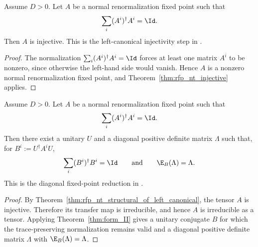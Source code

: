 \begin{theorem}%
    \label{thm:rfp_nt_structural_of_left_canonical}
    \leanok
    Assume $D > 0$. Let $A$ be a normal renormalization fixed point such that
    \[
        \sum_i (A^i)^\dagger A^i = \Id.
    \]
    Then $A$ is injective.
    This is the left-canonical injectivity step in
    \cite[Appendix~B]{Cirac2016MPDO_arXiv}.
\end{theorem}
\begin{proof}\leanok
    The normalization $\sum_i (A^i)^\dagger A^i = \Id$ forces at least one
    matrix $A^i$ to be nonzero, since otherwise the left-hand side would
    vanish. Hence $A$ is a nonzero normal renormalization fixed point, and
    Theorem~\ref{thm:rfp_nt_injective} applies.
\end{proof}

\begin{theorem}%
    \label{thm:rfp_nt_cfii_diagonal_fixed_point}
    \leanok
    Assume $D > 0$. Let $A$ be a normal renormalization fixed point such that
    \[
        \sum_i (A^i)^\dagger A^i = \Id.
    \]
    Then there exist a unitary $U$ and a diagonal positive definite matrix
    $\Lambda$ such that, for $B^i := U^\dagger A^i U$,
    \[
        \sum_i (B^i)^\dagger B^i = \Id
        \qquad\text{and}\qquad
        \E_B(\Lambda) = \Lambda.
    \]
    This is the diagonal fixed-point reduction in
    \cite[Appendix~B]{Cirac2016MPDO_arXiv}.
\end{theorem}
\begin{proof}\leanok
    By Theorem~\ref{thm:rfp_nt_structural_of_left_canonical}, the tensor $A$
    is injective. Therefore its transfer map is irreducible, and hence $A$ is
    irreducible as a tensor. Applying Theorem~\ref{thm:form_II} gives a
    unitary conjugate $B$ for which the trace-preserving normalization remains
    valid and a diagonal positive definite matrix $\Lambda$ with
    $\E_B(\Lambda) = \Lambda$.
\end{proof}

